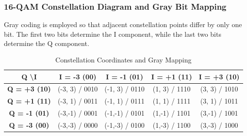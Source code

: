 \documentclass[a4paper]{article}
\begin{document}
\subsubsection{16-QAM Constellation Diagram and Gray Bit Mapping}
Gray coding is employed so that adjacent constellation points differ by only one bit. The first two bits determine the I component, while the last two bits determine the Q component.

\begin{table}[H]
\centering
\caption{Constellation Coordinates and Gray Mapping}
\vspace{0.2cm}
\begin{tabular}{ccccc}
\toprule
\textbf{Q \textbackslash I} & \textbf{I = -3 (00)} & \textbf{I = -1 (01)} & \textbf{I = +1 (11)} & \textbf{I = +3 (10)} \\
\midrule
\textbf{Q = +3 (10)} & (-3, 3) / 0010 & (-1, 3) / 0110 & (1, 3) / 1110 & (3, 3) / 1010 \\
\textbf{Q = +1 (11)} & (-3, 1) / 0011 & (-1, 1) / 0111 & (1, 1) / 1111 & (3, 1) / 1011 \\
\textbf{Q = -1 (01)} & (-3,-1) / 0001 & (-1,-1) / 0101 & (1,-1) / 1101 & (3,-1) / 1001 \\
\textbf{Q = -3 (00)} & (-3,-3) / 0000 & (-1,-3) / 0100 & (1,-3) / 1100 & (3,-3) / 1000 \\
\bottomrule
\end{tabular}
\end{table}
\end{document}
